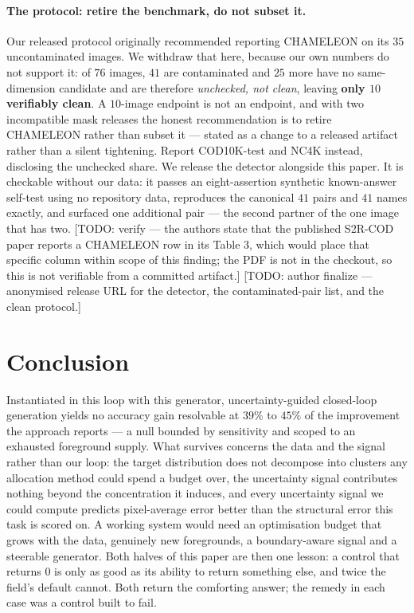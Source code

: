 \documentclass{article} %
\begin{document}
\paragraph{The protocol: retire the benchmark, do not subset it.} Our released protocol originally
recommended reporting CHAMELEON on its $35$ uncontaminated images. We withdraw that here, because our
own numbers do not support it: of $76$ images, $41$ are contaminated and $25$ more have no
same-dimension candidate and are therefore \emph{unchecked, not clean}, leaving \textbf{only $10$
verifiably clean}. A $10$-image endpoint is not an endpoint, and with two incompatible mask releases
the honest recommendation is to retire CHAMELEON rather than subset it --- stated as a change to a
released artifact rather than a silent tightening. Report COD10K-test and NC4K instead, disclosing the
unchecked share. We release the detector alongside this paper. It is checkable
without our data: it passes an eight-assertion synthetic known-answer self-test using no repository
data, reproduces the canonical $41$ pairs and $41$ names exactly, and surfaced one additional pair ---
the second partner of the one image that has two. [TODO: verify --- the authors state that the
published S2R-COD paper reports a CHAMELEON row in its Table 3, which would place that specific
column within scope of this finding; the PDF is not in the checkout, so this is not verifiable from a
committed artifact.] [TODO: author finalize --- anonymised release URL for the detector, the
contaminated-pair list, and the clean protocol.]

\section{Conclusion}
\label{sec:conclusion}

Instantiated in this loop with this generator, uncertainty-guided closed-loop generation yields no
accuracy gain resolvable at $39\%$ to $45\%$ of the improvement the approach reports --- a null bounded
by sensitivity and scoped to an exhausted foreground supply. What survives concerns the data and the
signal rather than our loop: the target distribution does not decompose into clusters any allocation
method could spend a budget over, the uncertainty signal contributes nothing beyond the concentration
it induces, and every uncertainty signal we could compute predicts pixel-average error better than the
structural error this task is scored on. A working system would need an optimisation
budget that grows with the data, genuinely new foregrounds, a boundary-aware signal and a steerable
generator. Both halves of this paper are then one lesson: a control that returns $0$ is only as good
as its ability to return something else, and twice the field's default cannot. Both return the
comforting answer; the remedy in each case was a control built to fail.
\end{document}
